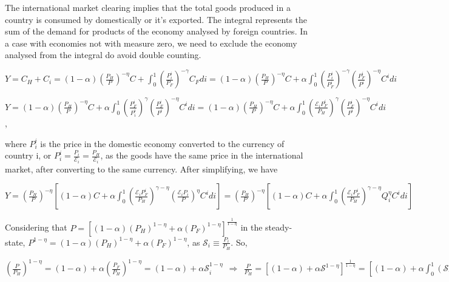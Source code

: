 \documentclass[
]{article}
\begin{document}
The international market clearing implies that the total goods produced
in a country is consumed by domestically or it's exported. The integral
represents the sum of the demand for products of the economy analysed by
foreign countries. In a case with economies not with measure zero, we
need to exclude the economy analysed from the integral do avoid double
counting.

\(\displaystyle Y=C_H+C_i=(1-\alpha)\left( \frac{P_{H}}{P} \right)^{-\eta}C + \int_0^1 \left( \frac{P_i^i}{P_F} \right)^{-\gamma}C_F di = (1-\alpha)\left( \frac{P_{H}}{P} \right)^{-\eta}C + \alpha \int_0^1 \left( \frac{P_i^i}{P_F^i} \right)^{-\gamma} \left( \frac{P_{F}^i}{P^i} \right)^{-\eta}C^idi\)

\(\displaystyle Y= (1-\alpha)\left( \frac{P_{H}}{P} \right)^{-\eta}C + \alpha \int_0^1 \left( \frac{P_F^i}{P_i^i} \right)^{\gamma} \left( \frac{P_{F}^i}{P^i} \right)^{-\eta}C^idi= (1-\alpha)\left( \frac{P_{H}}{P} \right)^{-\eta}C + \alpha \int_0^1 \left( \frac{\mathcal{E}_i P_F^i }{P_H} \right)^{\gamma} \left( \frac{P_{F}^i}{P^i} \right)^{-\eta}C^idi\),

where \(P_i^i\) is the price in the domestic economy converted to the
currency of country i, or
\(\displaystyle P_i^i = \frac{P_i}{\mathcal{E}_i} = \frac{P_H}{\mathcal{E}_i}\),
as the goods have the same price in the international market, after
converting to the same currency. After simplifying, we have

\(\displaystyle Y = \left( \frac{P_{H}}{P} \right)^{-\eta} \left[ (1-\alpha)C + \alpha \int_0^1 \left( \frac{ \mathcal{E}_i P_F^i }{P_H} \right)^{\gamma-\eta} \left( \frac{\mathcal{E}_i P_i}{P} \right)^\eta C^idi \right] = \left( \frac{P_{H}}{P} \right)^{-\eta} \left[ (1-\alpha)C + \alpha \int_0^1 \left( \frac{ \mathcal{E}_i P_F^i }{P_H} \right)^{\gamma-\eta} Q_i^\eta C^idi \right]\)

Considering that
\(\displaystyle P = \left[ (1-\alpha) \left( P_H \right)^{1-\eta} + \alpha \left( P_F\right)^{1-\eta} \right]^{\frac{1}{1-\eta}}\)
in the steady-state,
\(\displaystyle P^{1-\eta} = (1-\alpha) \left( P_H \right)^{1-\eta} + \alpha \left( P_F \right)^{1-\eta}\),
as \(\displaystyle \mathcal{S}_i \equiv \frac{P_i}{P_H}\). So,

\(\displaystyle \left( \frac{P}{P_H} \right)^{1-\eta} = (1-\alpha) + \alpha \left( \frac{P_F}{P_H}\right)^{1-\eta} = (1-\alpha) + \alpha \mathcal{S}_i^{1-\eta} \ \ \Rightarrow \ \ \frac{P}{P_H}=\left[ (1-\alpha)+\alpha \mathcal{S}^{1-\eta}\right]^{\frac{1}{1-\eta}}= \left[ (1-\alpha) + \alpha \int_0^1(\mathcal{S}_i)^{1-\eta}di \right]^{\frac{1}{1-\eta}} \equiv h(\mathcal{S})\)
\end{document}
